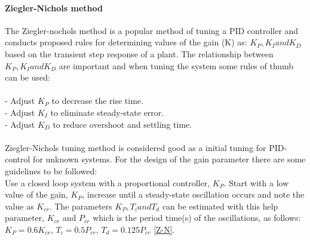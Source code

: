 \paragraph{Ziegler-Nichols method}
The Ziegler-nochols method is a popular method of tuning a PID controller and conducts proposed rules for determining values of the gain (K) as: $K_{P}, K_{I} and K_{D}$ based on the transient step response of a plant. The relationship between $K_{P}, K_{I} and K_{D}$ are important and when tuning the system some rules of thumb can be used: \\
\\
- Adjust $K_{P}$ to decrease the rise time.\\
- Adjust $K_{I}$ to eliminate steady-state error.\\
- Adjust $K_{D}$ to reduce overshoot and settling time.\\
\\
Ziegler-Nichols tuning method is considered good as a initial tuning for PID-control for unknown systems. For the design of the gain parameter there are some guidelines to be followed:\\
Use a closed loop system with a proportional controller, $K_{P}$. Start with a low value of the gain, $K_{P}$, increase until a steady-state oscillation occurs and note the value as $K_{cr}$. 
The parameters $K_{P}, T_{i} and T_{d}$ can be estimated with this help parameter, $K_{cr}$ and $P_{cr}$ which is the period time(s) of the oscillations, as follows: $K_{P}= 0.6K_{cr}$, $T_{i}= 0.5P_{cr}$, $T_{d}= 0.125P_{cr}$ \ref{Z-N}. 
\\
\\
